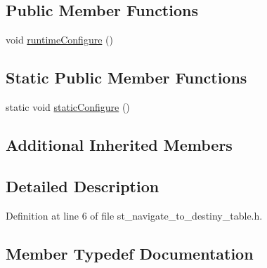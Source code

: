\subsection*{Public Member Functions}
\begin{DoxyCompactItemize}
\item 
void \hyperlink{structsm__moveit__4_1_1StNavigateToDestinyTable_a0915874e66bb71287faacf856c0ceaed}{runtime\+Configure} ()
\end{DoxyCompactItemize}
\subsection*{Static Public Member Functions}
\begin{DoxyCompactItemize}
\item 
static void \hyperlink{structsm__moveit__4_1_1StNavigateToDestinyTable_a2a53aaa5ef99206441170e41e59462e9}{static\+Configure} ()
\end{DoxyCompactItemize}
\subsection*{Additional Inherited Members}


\subsection{Detailed Description}


Definition at line 6 of file st\+\_\+navigate\+\_\+to\+\_\+destiny\+\_\+table.\+h.



\subsection{Member Typedef Documentation}
\mbox{\label{structsm__moveit__4_1_1StNavigateToDestinyTable_ae6317d7146c5e5611ad162f41e80c708}} 
